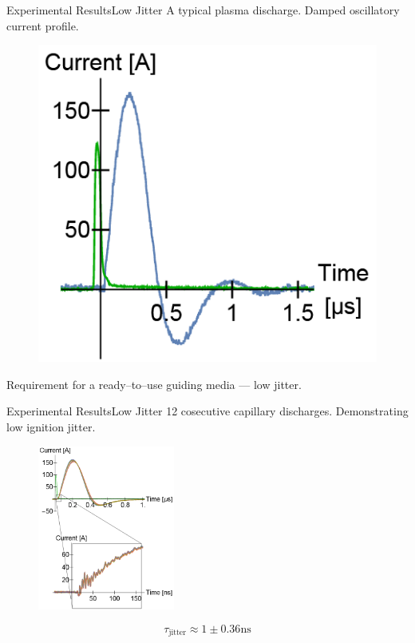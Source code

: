 \documentclass[draft]{beamer}
\begin{document}
  \begin{frame}{Experimental Results}{Low Jitter}
    A typical plasma discharge. Damped oscillatory current profile.
    \begin{figure}
      \includegraphics[]{figures/results/typical.png}
    \end{figure}
    Requirement for a ready--to--use guiding media --- low jitter.
  \end{frame}
  \begin{frame}{Experimental Results}{Low Jitter}
    12 cosecutive capillary discharges. Demonstrating low ignition jitter.
    \begin{figure}
      \includegraphics[width=0.4\textwidth]{figures/results/low_jitter.png}
    \end{figure}
    $$\tau_\text{jitter}\approx 1\pm 0.36 \si{\ns}$$
  \end{frame}
\end{document}

